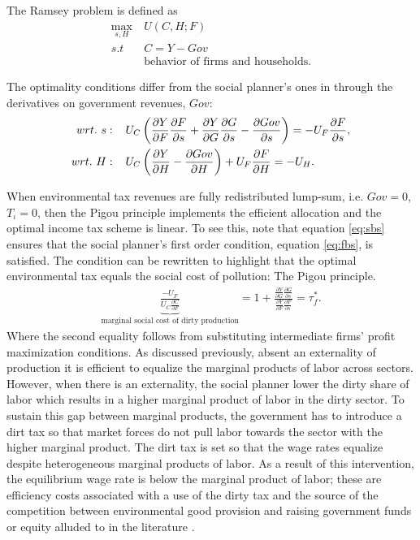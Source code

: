 The Ramsey problem is defined as
\begin{align}
\underset{s, H}{\max}\ & U(C,H; F)\\ s.t\ \ & C=Y-Gov\\ & \text{behavior of firms and households}.
\end{align}

The optimality conditions differ from the social planner's ones in through the derivatives on government revenues, $Gov$:
\begin{align}
wrt.\ s:\hspace{4mm} & U_C\left(\frac{\partial Y}{\partial F}\frac{\partial F}{\partial s}+\frac{\partial Y}{\partial G}\frac{\partial G}{\partial s}-\frac{\partial Gov}{ \partial s}\right)=-U_F\frac{\partial F}{\partial s}, \label{eq:sbs}
\\
wrt.\ H:\hspace{4mm} & U_C\left(\frac{\partial Y}{\partial H}-\frac{\partial Gov}{\partial H}\right)+U_F\frac{\partial F}{\partial H}=-U_H\label{eq:sbh}. 
\end{align}

When environmental tax revenues are fully redistributed lump-sum, i.e. $Gov=0$, $T_\iota=0$, then the Pigou principle implements the efficient allocation and the optimal income tax scheme is linear. 
To see this, note that equation \ref{eq:sbs} ensures that the social planner's first order condition, equation \ref{eq:fbs}, is satisfied. 
The condition can be rewritten to highlight that the optimal environmental tax equals the social cost of pollution: The Pigou principle. 
\begin{align}
\underbrace{\frac{-U_F}{U_C\frac{\partial C}{\partial F}}}_{\text{marginal social cost of dirty production}}=1+\frac{\frac{\partial Y}{\partial G}\frac{\partial G}{\partial s}}{\frac{\partial Y}{\partial F}\frac{\partial F}{\partial s}}=\tau^*_f.
\end{align}
Where the second equality follows from substituting intermediate firms' profit maximization conditions. 
As discussed previously, absent an externality of production it is efficient to equalize the marginal products of labor across sectors. However, when there is an externality, the social planner lower the dirty share of labor which results in a higher marginal product of labor in the dirty sector. To sustain this gap between marginal products, the government has to introduce a dirt tax so that market forces do not pull labor towards the sector with the higher marginal product. The dirt tax is set so that the wage rates equalize despite heterogeneous marginal products of labor. As a result of this intervention, the equilibrium wage rate is below the marginal product of labor; these are efficiency costs associated with a use of the dirty tax and the source of the competition between environmental good provision and raising government funds or equity alluded to in the literature \citep{LansBovenberg1994EnvironmentalTaxation}.  

